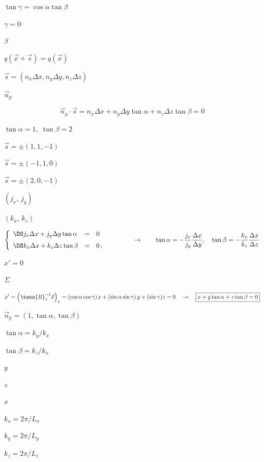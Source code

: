 \documentclass{article}
\begin{document}
$\tan\gamma = \cos\alpha\tan\beta$
\pagebreak

$\gamma = 0$
\pagebreak

$\beta$
\pagebreak

$ q(\vec{x}+\vec{s}) = q (\vec{x})$
\pagebreak

$\vec{s} = (n_x\Delta x, n_y \Delta y, n_z \Delta z)$
\pagebreak

$\vec{n}_p$
\pagebreak

\[  \vec{n}_p\cdot\vec{s} = n_x\Delta x + n_y\Delta y\tan\alpha
                                      + n_z\Delta z\tan\beta = 0
\]
\pagebreak

$\tan\alpha = 1,\;\tan\beta=2 $
\pagebreak

$\vec{s} = \pm(1,1,-1) $
\pagebreak

$\vec{s} = \pm (-1,1,0)$
\pagebreak

$\vec{s} = \pm (2,0,-1) $
\pagebreak

$(j_x,\, j_y)$
\pagebreak

$ (k_x,\, k_z)$
\pagebreak

\[   \left\{\begin{array}{lcl}
    \DS j_x\Delta x + j_y\Delta y \tan\alpha &=& 0  \\ \noalign{\medskip}
    \DS k_x\Delta x + k_z\Delta z \tan\beta  &=& 0  \,,\qquad
  \end{array}\right.
  \qquad\rightarrow\qquad
    \tan\alpha = -\frac{j_x}{j_y}\frac{\Delta x}{\Delta y} ,\quad
    \tan\beta  = -\frac{k_x}{k_z}\frac{\Delta x}{\Delta z}
\]
\pagebreak

$x' = 0$
\pagebreak

$\Sigma$
\pagebreak

\[  x' = \left(\tens{R}^{-1}_{\gamma} \vec{x}\right)_x
     =   (\cos\alpha\cos\gamma)\, x
       + (\sin\alpha\sin\gamma)\, y
       + (\sin\gamma) z = 0
  \quad\rightarrow\quad
  \boxed{x + y\tan\alpha + z\tan\beta = 0}
\]
\pagebreak

$\vec{n}_p = (1, \tan\alpha, \tan\beta)$
\pagebreak

$\tan\alpha = k_y/k_x$
\pagebreak

$\tan\beta = k_z/k_x$
\pagebreak

$y$
\pagebreak

$z$
\pagebreak

$x$
\pagebreak

$k_x = 2\pi/L_x$
\pagebreak

$k_y = 2\pi/L_y$
\pagebreak

$k_z = 2\pi/L_z$
\pagebreak
\end{document}
